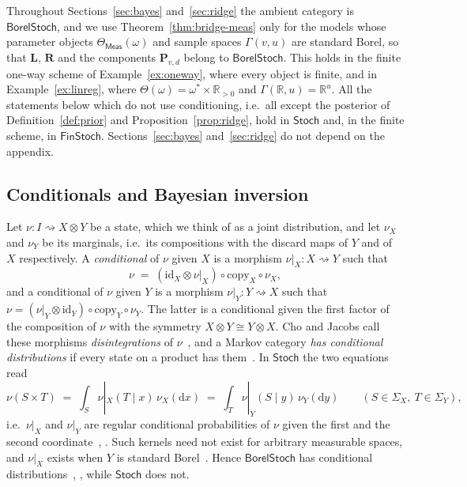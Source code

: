 \documentclass[11pt,a4paper]{article}
\theoremstyle{plain}
\theoremstyle{definition}
\theoremstyle{remark}
\newcommand{\cat}[1]{\mathsf{#1}}
\newcommand{\Meas}{\cat{Meas}}
\newcommand{\Stoch}{\cat{Stoch}}
\newcommand{\FinStoch}{\cat{FinStoch}}
\newcommand{\id}{\mathrm{id}}
\newcommand{\R}{\mathbb{R}}
\newcommand{\BorelStoch}{\cat{BorelStoch}}
\begin{document}
Throughout Sections~\ref{sec:bayes} and~\ref{sec:ridge} the ambient category is
$\BorelStoch$, and we use Theorem~\ref{thm:bridge-meas} only for the models
whose parameter objects $\Theta_\Meas(\omega)$ and sample spaces
$\Gamma(v,u)$ are standard Borel, so that $\mathbf{L}$, $\mathbf{R}$ and the
components $\mathbf P_{v,d}$ belong to $\BorelStoch$. This holds in the finite
one-way scheme of Example~\ref{ex:oneway}, where every object is finite, and in
Example~\ref{ex:linreg}, where $\Theta(\omega) = \omega^{*}\times\R_{>0}$ and
$\Gamma(\R,u) = \R^{u}$. All the statements below which do not use
conditioning, i.e.\ all except the posterior of Definition~\ref{def:prior} and
Proposition~\ref{prop:ridge}, hold in $\Stoch$ and, in the finite scheme, in
$\FinStoch$. Sections~\ref{sec:bayes} and~\ref{sec:ridge} do not depend on the
appendix.

\subsection{Conditionals and Bayesian inversion}

Let $\nu \colon I \rightsquigarrow X \otimes Y$ be a state, which we think of as
a joint distribution, and let $\nu_X$ and $\nu_Y$ be its marginals, i.e.\ its
compositions with the discard maps of $Y$ and of $X$ respectively. A
\emph{conditional} of $\nu$ given $X$ is a morphism
$\nu|_X \colon X \rightsquigarrow Y$ such that
\begin{equation}\label{eq:conditional}
\nu \;=\; (\id_X \otimes \nu|_X) \circ \mathrm{copy}_X \circ \nu_X ,
\end{equation}
and a conditional of $\nu$ given $Y$ is a morphism
$\nu|_Y \colon Y \rightsquigarrow X$ such that
$\nu = (\nu|_Y \otimes \id_Y) \circ \mathrm{copy}_Y \circ \nu_Y$. The latter is
a conditional given the first factor of the composition of $\nu$ with the
symmetry $X \otimes Y \cong Y \otimes X$. Cho and Jacobs call these morphisms
\emph{disintegrations} of $\nu$~\cite[Def.~3.5]{cho_disintegration_2019}, and a
Markov category \emph{has conditional distributions} if every state on a
product has them~\cite[Def.~11.1]{fritz_synthetic_2020}. In $\Stoch$ the two
equations read
\[
\nu(S \times T) \;=\; \int_{S} \nu|_X(T \mid x)\,\nu_X(\mathrm{d}x)
\;=\; \int_{T} \nu|_Y(S \mid y)\,\nu_Y(\mathrm{d}y)
\qquad (S \in \Sigma_X,\ T \in \Sigma_Y),
\]
i.e.\ $\nu|_X$ and $\nu|_Y$ are regular conditional probabilities of $\nu$
given the first and the second
coordinate~\cite[Ex.~11.3, eq.~(11.3)]{fritz_synthetic_2020},
\cite[Ex.~3.7]{cho_disintegration_2019}. Such kernels need not exist for
arbitrary measurable spaces, and $\nu|_X$ exists when $Y$ is standard
Borel~\cite[Thm.~3.11]{cho_disintegration_2019}. Hence $\BorelStoch$ has
conditional distributions~\cite[Ex.~11.3]{fritz_synthetic_2020},
\cite[Cor.~3.12]{cho_disintegration_2019}, while $\Stoch$ does not.
\end{document}
